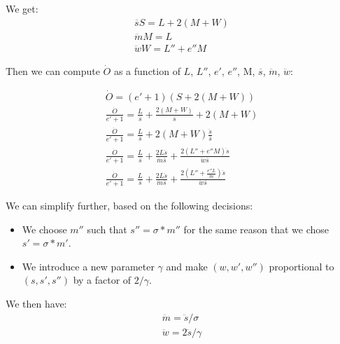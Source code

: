 \documentclass{article}
\begin{document}
We get:
\begin{gather}
\overline{s} S = L + 2(M + W) \\
\ddot{m}M = L \\
\ddot{w}W = L'' + e'' M
\end{gather}

Then we can compute $\dot{O}$ as a function of $L$, $L''$, $e'$,
$e''$, M, $\overline{s}$, $\ddot{m}$, $\ddot{w}$:

\begin{gather}
\dot{O} = (e'+1)(S + 2(M+W)) \\
\frac{\dot{O}}{e'+1}
 = \frac{L}{\overline{s}} + \frac{2(M+W)}{\overline{s}} + 2(M+W) \\
\frac{\dot{O}}{e'+1}
 = \frac{L}{\overline{s}} + 2(M+W)\frac{\ddot{s}}{\overline{s}} \\
\frac{\dot{O}}{e'+1}
 = \frac{L}{\overline{s}} + \frac{2L\ddot{s}}{\ddot{m}\overline{s}}
     + \frac{2(L''+e''M)\ddot{s}}{\ddot{w}\overline{s}} \\
\frac{\dot{O}}{e'+1}
 = \frac{L}{\overline{s}} + \frac{2L\ddot{s}}{\ddot{m}\overline{s}}
     + \frac{2(L''+\frac{e''L}{\ddot{m}})\ddot{s}}{\ddot{w}\overline{s}}
\end{gather}

\bigskip
\bigskip
\bigskip

We can simplify further, based on the following decisions:
\begin{itemize}
\item We choose $m''$ such that $s'' = \sigma * m''$ for the same
reason that we chose $s' = \sigma * m'$.
\item We introduce a new parameter $\gamma$ and make $(w, w', w'')$
       proportional to $(s, s', s'')$ by a factor of $2/\gamma$.
\end{itemize}

We then have:
\begin{gather}
\ddot{m} = \ddot{s} / \sigma \label{eqn-ms} \\
\ddot{w} = 2\ddot{s} / \gamma \label{eqn-ws}
\end{gather}
\end{document}
